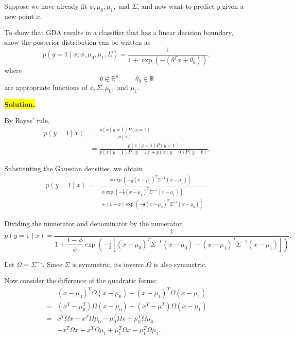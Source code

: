 \documentclass[10pt]{article}
\begin{document}
\begin{enumerate}
\begin{enumerate}[label=(\alph*)]
Suppose we have already fit $\phi,\mu_0,\mu_1,$ and $\Sigma$, and now
want to predict $y$ given a new point $x$.

To show that GDA results in a classifier that has a linear decision
boundary, show the posterior distribution can be written as
\[
p(y=1\mid x;\phi,\mu_0,\mu_1,\Sigma)
=
\frac{1}
{1+\exp\left(-(\theta^Tx+\theta_0)\right)},
\]
where
\[
\theta\in\mathbb{R}^n,
\qquad
\theta_0\in\mathbb{R}
\]
are appropriate functions of $\phi,\Sigma,\mu_0,$ and $\mu_1$.

\vspace{5mm}
\noindent\colorbox{yellow}{\textbf{Solution.}}

By Bayes' rule,
\[
\begin{aligned}
p(y=1\mid x)
&=
\frac{p(x\mid y=1)P(y=1)}{p(x)}
\\[4pt]
&=
\frac{p(x\mid y=1)P(y=1)}
{p(x\mid y=1)P(y=1)+p(x\mid y=0)P(y=0)}.
\end{aligned}
\]

Substituting the Gaussian densities, we obtain
\[
\begin{aligned}
p(y=1\mid x)
=
\frac{
\phi \exp\left(
-\frac12(x-\mu_1)^T\Sigma^{-1}(x-\mu_1)
\right)
}{
\begin{aligned}
&\phi \exp\left(
-\frac12(x-\mu_1)^T\Sigma^{-1}(x-\mu_1)
\right)
\\
&+(1-\phi)\exp\left(
-\frac12(x-\mu_0)^T\Sigma^{-1}(x-\mu_0)
\right)
\end{aligned}
}.
\end{aligned}
\]

Dividing the numerator and denominator by the numerator,
\[
p(y=1\mid x)
=
\frac{1}{
1+\dfrac{1-\phi}{\phi}
\exp\left(
-\frac12
\left[
(x-\mu_0)^T\Sigma^{-1}(x-\mu_0)
-
(x-\mu_1)^T\Sigma^{-1}(x-\mu_1)
\right]
\right)
}.
\]

Let $\Omega=\Sigma^{-1}$. Since $\Sigma$ is symmetric,
its inverse $\Omega$ is also symmetric.

Now consider the difference of the quadratic forms:
\[
\begin{aligned}
& (x-\mu_0)^T\Omega(x-\mu_0)
-(x-\mu_1)^T\Omega(x-\mu_1)
\\[4pt]
={}&
(x^T-\mu_0^T)\Omega(x-\mu_0)
-(x^T-\mu_1^T)\Omega(x-\mu_1)
\\[4pt]
={}&
x^T\Omega x
-x^T\Omega\mu_0
-\mu_0^T\Omega x
+\mu_0^T\Omega\mu_0
\\
&-x^T\Omega x
+x^T\Omega\mu_1
+\mu_1^T\Omega x
-\mu_1^T\Omega\mu_1.
\end{aligned}
\]


\end{enumerate}
\end{enumerate}
\end{document}
